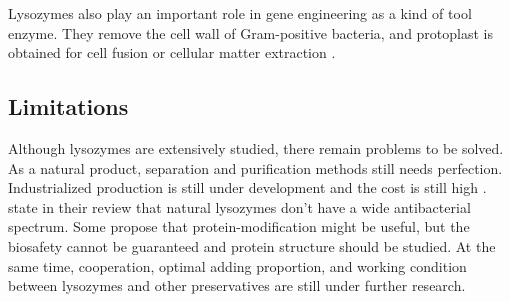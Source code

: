 Lysozymes also play an important role in gene engineering as a kind of tool enzyme. They remove the cell wall of Gram-positive bacteria, and protoplast is obtained for cell fusion or cellular matter extraction \citep{Yu-tong2006}.

\subsection{Limitations}
Although lysozymes are extensively studied, there remain problems to be solved. As a natural product, separation and purification methods still needs perfection. Industrialized production is still under development and the cost is still high \citet{ZHAI2015}. \citet{Zhao2009} state in their review that natural lysozymes don't have a wide antibacterial spectrum. Some propose that protein-modification might be useful, but the biosafety cannot be guaranteed and protein structure should be studied. At the same time, cooperation, optimal adding proportion, and working condition between lysozymes and other preservatives are still under further research\citet{ZHAI2015}.


